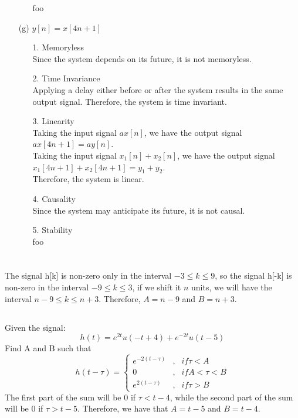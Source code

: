 \documentclass{article}
\begin{document}
\begin{enumerate}
\begin{enumerate}
                foo
        \end{enumerate}
    \item[(g)] $y[n] = x[4n+1]$
        \begin{enumerate}
            \item[1.] Memoryless \\
            Since the system depends on its future, it is not memoryless.
            \item[2.] Time Invariance \\
                Applying a delay either before or after the system results in the same output signal. Therefore, the system is time invariant.
            \item[3.] Linearity \\ 
                Taking the input signal $ax[n]$, we have the output signal $ax[4n+1] = ay[n]$. \\
                Taking the input signal $x_{1}[n]+x_{2}[n]$, we have the output signal $x_{1}[4n+1]+x_{2}[4n+1] = y_{1}+y_{2}$. \\
                Therefore, the system is linear.
            \item[4.] Causality \\
                Since the system may anticipate its future, it is not causal.
            \item[5.] Stability \\
                foo
        \end{enumerate}
\end{enumerate}
\section{}
\setcounter{subsection}{1}
\subsection{} The signal h[k] is non-zero only in the interval $-3 \leq k \leq 9$, so the signal h[-k] is non-zero in the interval $-9 \leq k \leq 3$, if we shift it $n$ units, we will have the interval $n-9 \leq k \leq n+3$. Therefore, $A = n-9$ and $B = n+3$.
\setcounter{subsection}{8}
\subsection{} Given the signal:
\begin{equation*}
h(t) = e^{2t}u(-t+4) + e^{-2t}u(t-5)
\end{equation*}
Find A and B such that
\begin{equation*}
h(t-\tau ) = \left\{ \begin{array}{cll}
e^{-2(t-\tau )}&, & if \tau < A  \\
0&, & if A < \tau < B \\
e^{2(t-\tau )}&, & if \tau > B
\end{array} \right.
\end{equation*}
The first part of the sum will be $0$ if $\tau < t-4$, while the second part of the sum will be $0$ if $\tau > t-5$. Therefore, we have that $A = t-5$ and $B = t-4$.
\setcounter{subsection}{20}
\end{document}
